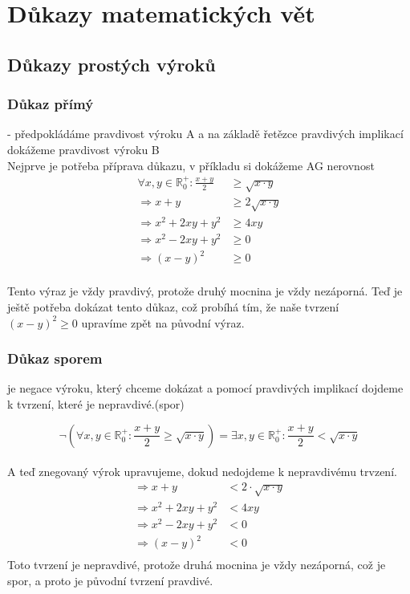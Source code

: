 \documentclass[12pt]{article}
\begin{document}
\section*{Důkazy matematických vět}
\subsection*{Důkazy prostých výroků}
\subsubsection*{Důkaz přímý} - předpokládáme pravdivost výroku A a na základě řetězce pravdivých implikací dokážeme pravdivost výroku B\\
Nejprve je potřeba příprava důkazu, v příkladu si dokážeme AG nerovnost 
\begin{align*}
\forall x,y \in \mathbb{R}_0^+ : \frac{x+y}{2}&\geq \sqrt{x\cdot y}\\
\Rightarrow x+y &\geq 2\sqrt{x\cdot y}\\
\Rightarrow x^2 + 2xy + y^2 &\geq 4xy\\
\Rightarrow x^2 - 2xy + y^2 &\geq 0\\
\Rightarrow (x-y)^2 &\geq 0\\ 
\end{align*}

Tento výraz je vždy pravdivý, protože druhý mocnina je vždy nezáporná. Teď je ještě potřeba dokázat tento důkaz, což probíhá tím, že naše tvrzení $(x-y)^2 \geq 0$ upravíme zpět na původní výraz.\\

\subsubsection*{Důkaz sporem} je negace výroku, který chceme dokázat a pomocí pravdivých implikací dojdeme k tvrzení, které je nepravdivé.(spor)

\[\neg(\forall x,y \in \mathbb{R}_0^+ : \frac{x+y}{2}\geq \sqrt{x\cdot y}) = \exists x,y \in \mathbb{R}_0^+ : \frac{x+y}{2}<\sqrt{x\cdot y}\]\\
A teď znegovaný výrok upravujeme, dokud nedojdeme k nepravdivému trvzení.
\begin{align*}
\Rightarrow x+y &< 2\cdot \sqrt{x\cdot y}\\
\Rightarrow x^2 + 2xy + y^2 &< 4xy\\
\Rightarrow x^2 - 2xy + y^2 &< 0\\
\Rightarrow (x-y)^2 &< 0\\
\end{align*}
Toto tvrzení je nepravdivé, protože druhá mocnina je vždy nezáporná, což je spor, a proto je původní tvrzení pravdivé.
\end{document}
